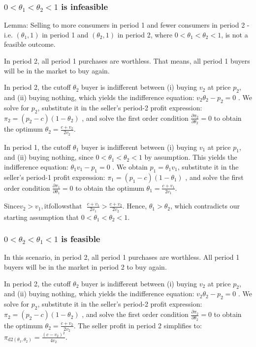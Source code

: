 \documentclass{article}
\begin{document}
\subsubsection*{\(0<\theta _1<\theta _2<1\) is infeasible }

Lemma: Selling to more consumers in period 1 and fewer consumers in period 2 - i.e. \(\left(\theta _1,1\right)\) { }in period 1 and { }\(\left(\theta
_2,1\right)\) in period 2, where \(0<\theta _1<\theta _2<1\), is not a feasible outcome. { } 


In period 2, all period 1 purchases are worthless. That means, all period 1 buyers will be in the market to buy again.

In period 2, the cutoff \(\theta _2\) buyer is indifferent between (i) buying \(v_2\) at price \(p_2\), and (ii) buying nothing, which yields the
indifference equation: \(v_2 \theta _2-p_2 = 0\) . We solve for \(p_2\), substitute it in the seller{'}s period-2 profit expression: \(\pi _2=\left(p_2-c\right)\left(1-\theta
_2\right)\) , and solve the first order condition \(\frac{\partial \pi _2}{\partial \theta _2}=0\) to obtain the optimum \(\theta _2=\frac{c+v_2}{2
v_2}\).

In period 1, the cutoff \(\theta _1\) buyer is indifferent between (i) buying \(v_1\) at price \(p_1\), and (ii) buying nothing, since \(0<\theta
_1<\theta _2<1\) by assumption. This { }yields the indifference equation: \(\theta _1v_1 - p_1 =0\) . We obtain \(p_1=\theta _1v_1\), substitute
it in the seller{'}s period-1 profit expression: \(\pi _1=\left(p_1-c\right)\left(1-\theta _1\right)\) , and solve the first order condition \(\frac{\partial
\pi _1}{\partial \theta _1}=0\) to obtain the optimum \(\theta _1=\frac{c+v_1}{2 v_1}\). 

\(\text{Since} v_2>v_1 , \text{it} \text{follows} \text{that}\text{  }\frac{c+v_1}{2 v_1}>\frac{c+v_2}{2 v_2}.\) Hence, \(\theta _1>\theta _2\),
which contradicts our starting assumption that \(0<\theta _1<\theta _2<1\).

\subsubsection*{\(0<\theta _2<\theta _1<1\) is feasible}

In this scenario, in period 2, all period 1 purchases are worthless. All period 1 buyers will be in the market in period 2 to buy again.

In period 2, the cutoff \(\theta _2\) buyer is indifferent between (i) buying \(v_2\) at price \(p_2\), and (ii) buying nothing, which yields the
indifference equation: \(v_2 \theta _2-p_2 = 0\) . We solve for \(p_2\), substitute it in the seller{'}s period-2 profit expression: \(\pi _2=\left(p_2-c\right)\left(1-\theta
_2\right)\) , and solve the first order condition \(\frac{\partial \pi _2}{\partial \theta _2}=0\) to obtain the optimum \(\theta _2=\frac{c+v_2}{2
v_2}\). The seller profit in period 2 simplifies to: \(\pi _{\text{d2}\left(\theta _1,\theta _2\right)}=\frac{\left(c-v_2\right){}^2}{4 v_2}\).
\end{document}
